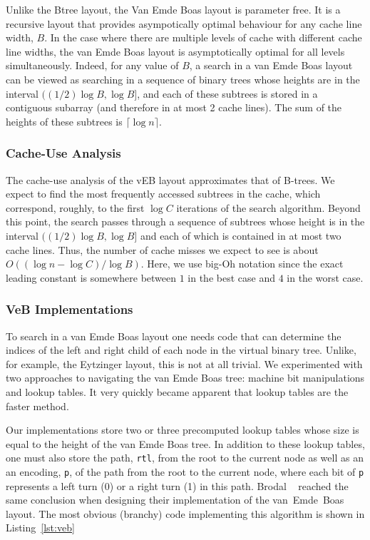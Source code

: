 \documentclass{patmorin}
\newcommand{\lstref}[1]{Listing~\ref{lst:#1}}
\begin{document}
Unlike the Btree layout, the Van Emde Boas layout is parameter free.
It is a recursive layout that provides asympotically optimal behaviour
for any cache line width, $B$.  In the case where there are multiple
levels of cache with different cache line widths, the van Emde Boas
layout is asymptotically optimal for all levels simultaneously.  Indeed,
for any value of $B$, a search in a van Emde Boas layout can be viewed
as searching in a sequence of binary trees whose heights are in the
interval $((1/2)\log B,\log B]$, and each of these subtrees is stored
in a contiguous subarray (and therefore in at most 2 cache lines).
The sum of the heights of these subtrees is $\lceil\log n\rceil$.


\subsubsection{Cache-Use Analysis}

The cache-use analysis of the vEB layout approximates that of B-trees.
We expect to find the most frequently accessed subtrees in the cache,
which correspond, roughly, to the first $\log C$ iterations of the search
algorithm.  Beyond this point, the search passes through a sequence of
subtrees whose height is in the interval $((1/2)\log B,\log B]$ and each of
which is contained in at most two cache lines.  Thus, the number of cache
misses we expect to see is about $O((\log n - \log C)/\log B)$.  Here,
we use big-Oh notation since the exact leading constant is somewhere
between $1$ in the best case and $4$ in the worst case.

\subsubsection{VeB Implementations}

To search in a van Emde Boas layout one needs code that can determine
the indices of the left and right child of each node in the virtual
binary tree.  Unlike, for example, the Eytzinger layout, this is not at
all trivial. We experimented with two approaches to navigating the van
Emde Boas tree: machine bit manipulations and lookup tables.  It very
quickly became apparent that lookup tables are the faster method.

Our implementations store two or three precomputed lookup tables whose
size is equal to the height of the van Emde Boas tree. In addition to
these lookup tables, one must also store the path, \texttt{rtl},
from the root to the current node as well as an an encoding,
\texttt{p}, of the path from the root to the current node, where
each bit of \texttt{p} represents a left turn (0) or a right
turn (1) in this path.  Brodal \etal\ \cite{brodal.fagerberg.ea:cache}
reached the same conclusion when designing their implementation of the
van~Emde~Boas layout.  The most obvious (branchy) code implementing this
algorithm is shown in \lstref{veb}
\end{document}
